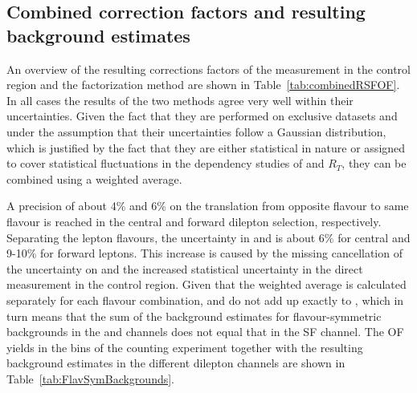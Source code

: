 \subsection{Combined correction factors and resulting background estimates}
An overview of the resulting corrections factors of the measurement in the control region and the factorization method are shown in Table~\ref{tab:combinedRSFOF}. In all cases the results of the two methods agree very well within their uncertainties. Given the fact that they are performed on exclusive datasets and under the assumption that their uncertainties follow a Gaussian distribution, which is justified by the fact that they are either statistical in nature or assigned to cover statistical fluctuations in the dependency studies of \rmue and $R_T$, they can be combined using a weighted average. 
 
A precision of about 4\% and 6\% on the translation from opposite flavour to same flavour is reached in the central and forward dilepton selection, respectively. Separating the lepton flavours, the uncertainty in \Reeof and \Rmmof is about 6\% for central and 9-10\% for forward leptons. This increase is caused by the missing cancellation of the uncertainty on \rmue and the increased statistical uncertainty in the direct measurement in the control region. Given that the weighted average is calculated separately for each flavour combination, \Reeof and \Rmmof do not add up exactly to \Rsfof, which in turn means that the sum of the background estimates for flavour-symmetric backgrounds in the \EE and \MM channels does not equal that in the SF channel. The OF yields in the \mll bins of the counting experiment together with the resulting background estimates in the different dilepton channels are shown in Table~\ref{tab:FlavSymBackgrounds}. 





